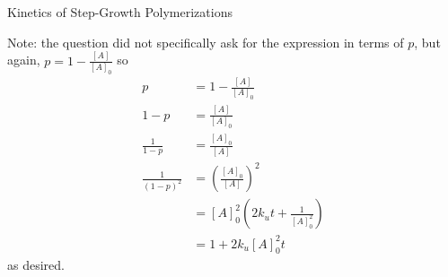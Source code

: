 \begin{activity}{Kinetics of Step-Growth Polymerizations}
\begin{exercises}
\begin{solution}{}
						Note: the question did not specifically ask for the expression in terms of $p$, but again, $p=1-\frac{[A]}{[A]_0}$ so
						\begin{align*}
							p &= 1-\frac{[A]}{[A]_0} \\
							1-p &= \frac{[A]}{[A]_0} \\
							\frac{1}{1-p} &= \frac{[A]_0}{[A]}\\
							\frac{1}{(1-p)^2} &= \left(\frac{[A]_0}{[A]}\right)^2\\
							 &= [A]_0^2\left(2k_u t + \frac{1}{[A]_0^2}\right)\\
								&= 1+ 2k_u[A]_0^2 t
						\end{align*}
						as desired.
					\end{solution}
				
			
		
		
\end{exercises}
	
\end{activity}
